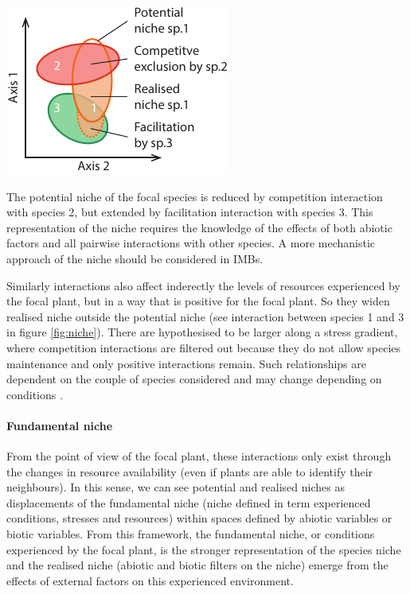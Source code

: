 \begin{marginfigure}
    \includegraphics{./1_Introduction/graphics/niches.pdf}
  \caption[Different niches]{The potential niche of the \textcolor{myOrange}{focal} species is reduced by competition interaction with \textcolor{myRed}{species 2}, but extended by facilitation interaction with \textcolor{myGreen}{species 3}. This representation of the niche requires the knowledge of the effects of both abiotic factors and all pairwise interactions with other species. A more mechanistic approach of the niche should be considered in IMBs.}
  \label{fig:niche}
\end{marginfigure}

Similarly  interactions also affect inderectly the levels of resources experienced by the focal plant, but in a way that is positive for the focal plant. So they widen realised niche outside the potential niche (see interaction between species 1 and 3 in figure \ref{fig:niche}). There are hypothesised to be larger along a stress gradient, where competition interactions are filtered out because they do not allow species maintenance and only positive interactions remain. Such relationships are dependent on the couple of species considered and may change depending on conditions \parencite{callaway_phenotypic_2003}.

\paragraph{Fundamental niche}
 From the point of view of the focal plant, these interactions only exist through the changes in resource availability (even if plants are able to identify their neighbours). In this sense, we can see potential and realised niches as displacements of the fundamental niche (niche defined in term experienced conditions, stresses and resources) within spaces defined by abiotic variables or biotic variables. From this framework, the fundamental niche, or conditions experienced by the focal plant, is the stronger representation of the species niche and the realised niche (abiotic and biotic filters on the niche) emerge from the effects of external factors on this experienced environment.

